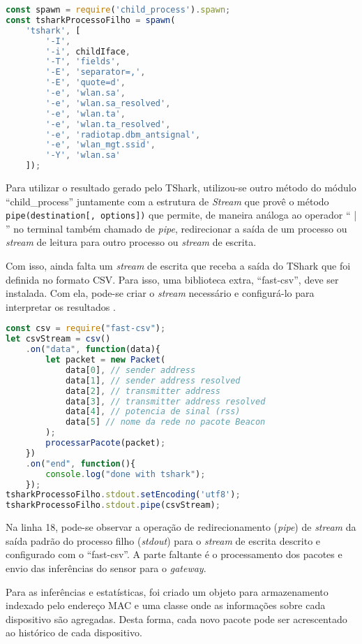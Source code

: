 \begin{lstlisting}[language=javascript,caption={TShark e opções executado pelo Node.js},label=code-node-tshark]
const spawn = require('child_process').spawn;
const tsharkProcessoFilho = spawn(
	'tshark', [
		'-I',
		'-i', childIface,
		'-T', 'fields',
		'-E', 'separator=,',
		'-E', 'quote=d',
		'-e', 'wlan.sa',
		'-e', 'wlan.sa_resolved',
		'-e', 'wlan.ta',
		'-e', 'wlan.ta_resolved',
		'-e', 'radiotap.dbm_antsignal',
		'-e', 'wlan_mgt.ssid',
		'-Y', 'wlan.sa'
	]);
\end{lstlisting}

Para utilizar o resultado gerado pelo TShark, utilizou-se outro método do
módulo ``child\_process''  juntamente com a estrutura de \emph{Stream}
\cite{stream} que provê o método \texttt{pipe(destination[, options])} que permite,
de maneira análoga ao operador `` | '' no terminal também chamado de \emph{pipe},
redirecionar a saída de um processo ou \emph{stream} de leitura para outro
processo ou \emph{stream} de escrita.

Com isso, ainda falta um \emph{stream} de escrita que receba a saída do
TShark que foi definida no formato CSV. Para isso, uma biblioteca extra,
``fast-csv'', deve ser instalada. Com ela, pode-se criar o \emph{stream}
necessário e configurá-lo para interpretar os resultados \cite{fast-csv}.

\begin{lstlisting}[language=javascript,caption={Uso do fast-csv},label=code-node-csv]
const csv = require("fast-csv");
let csvStream = csv()
	.on("data", function(data){
		let packet = new Packet(
			data[0], // sender address
			data[1], // sender address resolved
			data[2], // transmitter address
			data[3], // transmitter address resolved
			data[4], // potencia de sinal (rss)
			data[5] // nome da rede no pacote Beacon
		);
		processarPacote(packet);
	})
	.on("end", function(){
		console.log("done with tshark");
	});
tsharkProcessoFilho.stdout.setEncoding('utf8');
tsharkProcessoFilho.stdout.pipe(csvStream);
\end{lstlisting}

Na linha 18, pode-se observar a operação de redirecionamento (\emph{pipe})
de \emph{stream} da saída padrão do processo filho (\emph{stdout}) para o
\emph{stream} de escrita descrito e configurado com o ``fast-csv''. A parte
faltante é o processamento dos pacotes e envio das inferências do sensor para o
\emph{gateway}.

Para as inferências e estatísticas, foi criado um objeto para armazenamento indexado
pelo endereço MAC e uma classe onde as informações
sobre cada dispositivo são agregadas. Desta forma, cada novo pacote pode ser acrescentado ao
histórico de cada dispositivo.


